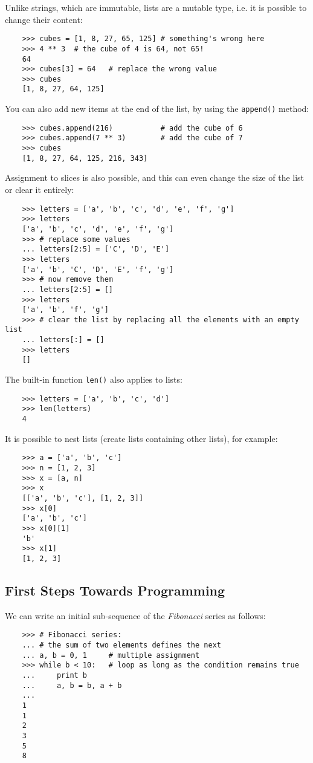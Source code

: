 \documentclass[UTF8]{article}
\begin{document}
Unlike strings, which are immutable, lists are a mutable type, i.e. it is possible to change their
content:
\begin{verbatim}
    >>> cubes = [1, 8, 27, 65, 125] # something's wrong here
    >>> 4 ** 3  # the cube of 4 is 64, not 65!
    64
    >>> cubes[3] = 64   # replace the wrong value
    >>> cubes
    [1, 8, 27, 64, 125]
\end{verbatim}

You can also add new items at the end of the list, by using the \texttt{append()} method:
\begin{verbatim}
    >>> cubes.append(216)           # add the cube of 6
    >>> cubes.append(7 ** 3)        # add the cube of 7
    >>> cubes
    [1, 8, 27, 64, 125, 216, 343]
\end{verbatim}

Assignment to slices is also possible, and this can even change the size of the list or clear it
entirely:
\begin{verbatim}
    >>> letters = ['a', 'b', 'c', 'd', 'e', 'f', 'g']
    >>> letters
    ['a', 'b', 'c', 'd', 'e', 'f', 'g']
    >>> # replace some values
    ... letters[2:5] = ['C', 'D', 'E']
    >>> letters
    ['a', 'b', 'C', 'D', 'E', 'f', 'g']
    >>> # now remove them
    ... letters[2:5] = []
    >>> letters
    ['a', 'b', 'f', 'g']
    >>> # clear the list by replacing all the elements with an empty list
    ... letters[:] = []
    >>> letters
    []
\end{verbatim}

The built-in function \texttt{len()} also applies to lists:
\begin{verbatim}
    >>> letters = ['a', 'b', 'c', 'd']
    >>> len(letters)
    4
\end{verbatim}

It is possible to nest lists (create lists containing other lists), for example:
\begin{verbatim}
    >>> a = ['a', 'b', 'c']
    >>> n = [1, 2, 3]
    >>> x = [a, n]
    >>> x
    [['a', 'b', 'c'], [1, 2, 3]]
    >>> x[0]
    ['a', 'b', 'c']
    >>> x[0][1]
    'b'
    >>> x[1]
    [1, 2, 3]
\end{verbatim}

\subsection{First Steps Towards Programming}
We can write an initial sub-sequence of the \emph{Fibonacci} series as follows:
\begin{verbatim}
    >>> # Fibonacci series:
    ... # the sum of two elements defines the next
    ... a, b = 0, 1     # multiple assignment
    >>> while b < 10:   # loop as long as the condition remains true
    ...     print b
    ...     a, b = b, a + b
    ...
    1
    1
    2
    3
    5
    8
\end{verbatim}
\end{document}
